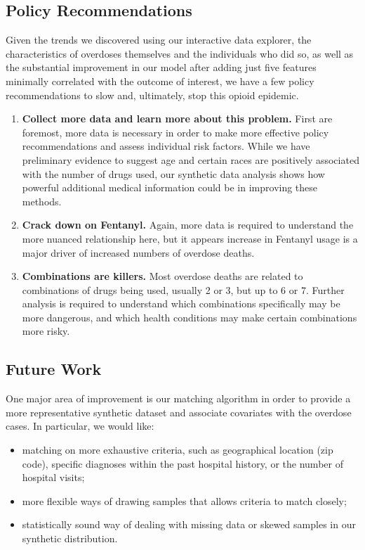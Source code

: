 \documentclass{article}
\begin{document}
\subsection{Policy Recommendations}
Given the trends we discovered using our interactive data explorer, the characteristics of overdoses themselves and the individuals who did so, as well as the substantial improvement in our model after adding just five features minimally correlated with the outcome of interest, we have a few policy recommendations to slow and, ultimately, stop this opioid epidemic.
\begin{enumerate}
\item {\bf Collect more data and learn more about this problem.} First are foremost, more data is necessary in order to make more effective policy recommendations and assess individual risk factors. While we have preliminary evidence to suggest age and certain races are positively associated with the number of drugs used, our synthetic data analysis shows how powerful additional medical information could be in improving these methods.
\item {\bf Crack down on Fentanyl.} Again, more data is required to understand the more nuanced relationship here, but it appears increase in Fentanyl usage is a major driver of increased numbers of overdose deaths.
\item {\bf Combinations are killers.} Most overdose deaths are related to combinations of drugs being used, usually 2 or 3, but up to 6 or 7. Further analysis is required to understand which combinations specifically may be more dangerous, and which health conditions may make certain combinations more risky.
\end{enumerate}

\subsection{Future Work}
One major area of improvement is our matching algorithm in order to provide a more representative synthetic dataset and associate covariates with the overdose cases. In particular, we would like:
\begin{itemize}
\item matching on more exhaustive criteria, such as geographical location (zip code), specific diagnoses within the past hospital history, or the number of hospital visits;
\item more flexible ways of drawing samples that allows criteria to match closely;
\item statistically sound way of dealing with missing data or skewed samples in our synthetic distribution.
\end{itemize}
\end{document}
